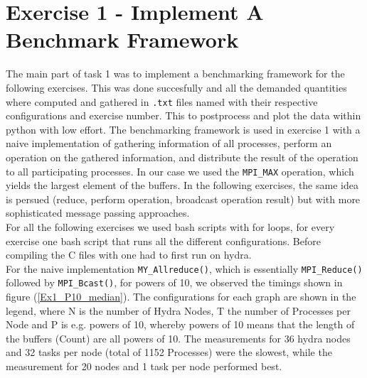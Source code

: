 \section{Exercise 1 - Implement A Benchmark Framework}

The main part of task 1 was to implement a benchmarking framework for the following exercises. This was done succesfully 
and all the demanded quantities where computed and gathered in \texttt{.txt} files named with their respective
configurations and exercise number. This to postprocess and plot the data within python with low effort. 
The benchmarking framework is used in exercise 1 with a naive implementation of gathering information of all processes, 
perform an operation on the gathered information, and distribute the result of the operation to all 
participating processes. In our case we used the \texttt{MPI\_MAX} operation, which yields the largest 
element of the buffers. In the following exercises, the same idea is persued (reduce, perform operation, 
broadcast operation result) but with more sophisticated message passing approaches. \\

For all the following exercises we used bash scripts with for loops, for every exercise one bash script that
runs all the different configurations. Before compiling the C files with  one had to first run
 on hydra.\\ 

For the naive implementation \texttt{MY\_Allreduce()}, which is essentially \texttt{MPI\_Reduce()} followed 
by \texttt{MPI\_Bcast()}, for powers of 10, we observed the timings shown in figure (\ref{Ex1_P10_median}).
The configurations for each graph are shown in the legend, where N is the number of Hydra Nodes, T 
the number of Processes per Node and P is e.g. powers of 10, whereby powers of 10 means that the length 
of the buffers (Count) are all powers of 10. The measurements for 36 hydra nodes and 32 tasks per node (total of 1152 \MPI 
Processes) were the slowest, while the measurement for 20 nodes and 1 task per node performed best.

